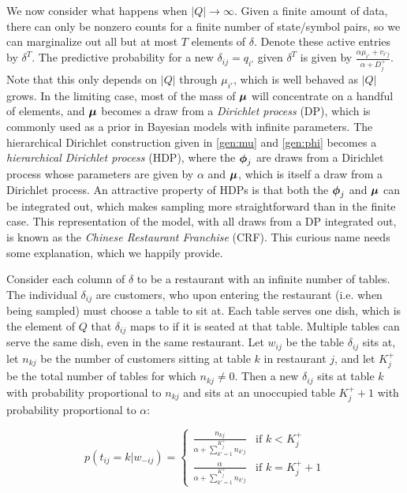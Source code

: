 We now consider what happens when $|Q|\rightarrow\infty$.  Given a finite amount of data, there can only be nonzero counts for a finite number of state/symbol pairs, so we can marginalize out all but at most $T$ elements of $\delta$.  Denote these active entries by $\delta^T$.  The predictive probability for a new $\delta_{ij} = q_{i'}$ given $\delta^T$ is given by $\frac{\alpha\mu_{i'} + v_{i'j}}{\alpha + D^+_j}$.  Note that this only depends on $|Q|$ through $\mu_{i'}$, which is well behaved as $|Q|$ grows.  In the limiting case, most of the mass of $\bmu$ will concentrate on a handful of elements, and $\bmu$ becomes a draw from a {\em Dirichlet process} (DP), which is commonly used as a prior in Bayesian models with infinite parameters.  The hierarchical Dirichlet construction given in \eqref{gen:mu} and \eqref{gen:phi} becomes a {\em hierarchical Dirichlet process} (HDP), where the $\bphi_j$ are draws from a Dirichlet process whose parameters are given by $\alpha$ and $\bmu$, which is itself a draw from a Dirichlet process.  An attractive property of HDPs is that both the $\bphi_j$ and $\bmu$ can be integrated out, which makes sampling more straightforward than in the finite case.  This  representation of the model, with all draws from a DP integrated out, is known as the {\em Chinese Restaurant Franchise} (CRF).  This curious name needs some explanation, which we happily provide.
 
Consider each column of $\delta$ to be a restaurant with an infinite number of tables.  The individual $\delta_{ij}$ are customers, who upon entering the restaurant (i.e. when being sampled) must choose a table to sit at.  Each table serves one dish, which is the element of $Q$ that $\delta_{ij}$ maps to if it is seated at that table.  Multiple tables can serve the same dish, even in the same restaurant.  Let $w_{ij}$ be the table $\delta_{ij}$ sits at, let $n_{kj}$ be the number of customers sitting at table $k$ in restaurant $j$, and let $K^+_j$ be the total number of tables for which $n_{kj} \ne 0$.  Then a new $\delta_{ij}$ sits at table $k$ with probability proportional to $n_{kj}$ and sits at an unoccupied table $K^+_j + 1$ with probability proportional to $\alpha$:

\begin{equation}
 p(t_{ij} = k | w_{-ij}) = 
 \begin{cases} 
 \frac{n_{kj}}{\alpha + \sum_{k'=1}^{K^+_j}n_{k'j}} & \text{if } k < K^+_j \\
 \frac{\alpha}{\alpha + \sum_{k'=1}^{K^+_j}n_{k'j}} & \text{if } k = K^+_j + 1\label{crf:low}
 \end{cases}
\end{equation}


